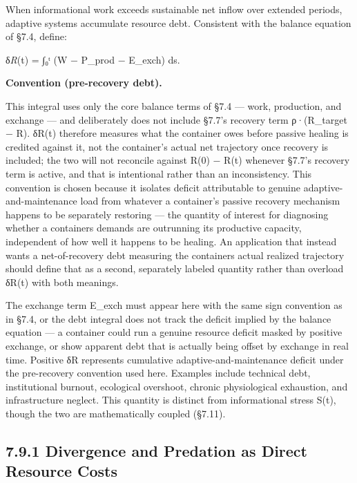 \documentclass[
]{article}
\begin{document}
When informational work exceeds sustainable net inflow over extended
periods, adaptive systems accumulate resource debt. Consistent with the
balance equation of §7.4, define:

δ\emph{R}(t) = ∫₀ᵗ (W − P\_prod − E\_exch) ds.

\textbf{Convention (pre-recovery debt).}

This integral uses only the core balance terms of §7.4 --- work,
production, and exchange --- and deliberately does not include §7.7's
recovery term ρ·(R\_target − R). δR(t) therefore measures what the
container owes before passive healing is credited against it, not the
container's actual net trajectory once recovery is included; the two
will not reconcile against R(0) − R(t) whenever §7.7's recovery term is
active, and that is intentional rather than an inconsistency. This
convention is chosen because it isolates deficit attributable to genuine
adaptive-and-maintenance load from whatever a container's passive
recovery mechanism happens to be separately restoring --- the quantity
of interest for diagnosing whether a containers demands are outrunning
its productive capacity, independent of how well it happens to be
healing. An application that instead wants a net-of-recovery debt
measuring the containers actual realized trajectory should define that
as a second, separately labeled quantity rather than overload δR(t) with
both meanings.

The exchange term E\_exch must appear here with the same sign convention
as in §7.4, or the debt integral does not track the deficit implied by
the balance equation --- a container could run a genuine resource
deficit masked by positive exchange, or show apparent debt that is
actually being offset by exchange in real time. Positive δR represents
cumulative adaptive-and-maintenance deficit under the pre-recovery
convention used here. Examples include technical debt, institutional
burnout, ecological overshoot, chronic physiological exhaustion, and
infrastructure neglect. This quantity is distinct from informational
stress S(t), though the two are mathematically coupled (§7.11).

\hypertarget{divergence-and-predation-as-direct-resource-costs}{%
\subsection{7.9.1 Divergence and Predation as Direct Resource
Costs}\label{divergence-and-predation-as-direct-resource-costs}}
\end{document}
